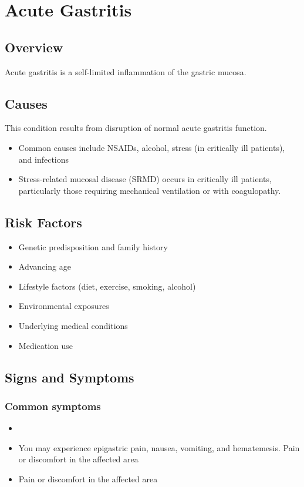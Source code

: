 \chapter{Acute Gastritis}
\label{sec:Acute Gastritis}

\section{Overview}
Acute gastritis is a self-limited inflammation of the gastric mucosa.
\section{Causes}
This condition results from disruption of normal acute gastritis function.

\begin{itemize}[noitemsep]
  \item Common causes include NSAIDs, alcohol, stress (in critically ill patients), and infections
  \item Stress-related mucosal disease (SRMD) occurs in critically ill patients, particularly those requiring mechanical ventilation or with coagulopathy.
\end{itemize}
\section{Risk Factors}


\begin{itemize}[noitemsep]
  \item Genetic predisposition and family history
  \item Advancing age
  \item Lifestyle factors (diet, exercise, smoking, alcohol)
  \item Environmental exposures
  \item Underlying medical conditions
  \item Medication use
\end{itemize}
\section{Signs and Symptoms}

\subsection{Common symptoms}
\begin{itemize}[noitemsep]
  \item \item You may experience epigastric pain, nausea, vomiting, and hematemesis. Pain or discomfort in the affected area    \item Pain or discomfort in the affected area
  \end{itemize}


